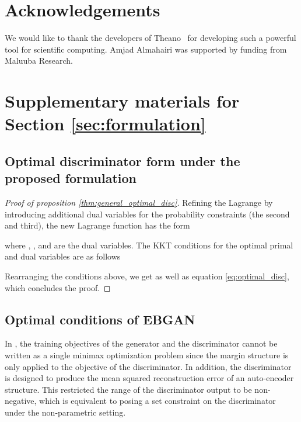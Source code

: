 \documentclass[a4paper]{article}
\begin{document}
 \section{Acknowledgements}
We would like to thank the developers of Theano~\citep{2016arXiv160502688short} for developing such a powerful tool for scientific computing. Amjad Almahairi was supported by funding from Maluuba Research. 
\newpage




\newpage

\appendix

\section{Supplementary materials for Section \ref{sec:formulation}}
\subsection{Optimal discriminator form under the proposed formulation}
\label{sec:proof_for_formulation}

\begin{proof}[Proof of proposition \ref{thm:general_optimal_disc}]
Refining the Lagrange  by introducing additional dual variables for the probability constraints (the second and third), the new Lagrange function has the form

where , , and  are the dual variables.
The KKT conditions for the optimal primal and dual variables are as follows

Rearranging the conditions above, we get  as well as equation \eqref{eq:optimal_disc}, which concludes the proof.
\end{proof}

\subsection{Optimal conditions of EBGAN}
\label{sec:ebgan_proof}

In \citep{zhao2016energy}, the training objectives of the generator and the discriminator cannot be written as a single minimax optimization problem since the margin structure is only applied to the objective of the discriminator.
In addition, the discriminator is designed to produce the mean squared reconstruction error of an auto-encoder structure.
This restricted the range of the discriminator output to be non-negative, which is equivalent to posing a set constraint on the discriminator under the non-parametric setting.
\end{document}
